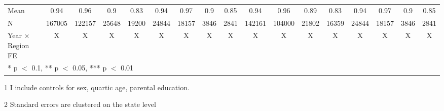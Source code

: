 \begin{landscape}
\begin{table}[H]
{\begin{threeparttable}
\begin{tabular}[t]{lcccccccccccccccc}
\midrule
Mean & \num{0.94} & \num{0.96} & \num{0.9} & \num{0.83} & \num{0.94} & \num{0.97} & \num{0.9} & \num{0.85} & \num{0.94} & \num{0.96} & \num{0.89} & \num{0.83} & \num{0.94} & \num{0.97} & \num{0.9} & \num{0.85}\\
N & \num{167005} & \num{122157} & \num{25648} & \num{19200} & \num{24844} & \num{18157} & \num{3846} & \num{2841} & \num{142161} & \num{104000} & \num{21802} & \num{16359} & \num{24844} & \num{18157} & \num{3846} & \num{2841}\\
Year $\times$ Region FE & X & X & X & X & X & X & X & X & X & X & X & X & X & X & X & X\\
\bottomrule
\multicolumn{17}{l}{\rule{0pt}{1em}* p $<$ 0.1, ** p $<$ 0.05, *** p $<$ 0.01}\\
\end{tabular}
\begin{tablenotes}
\small
\item[1] I include controls for sex, quartic age, parental education.
\item[2] Standard errors are clustered on the state level
\end{tablenotes}
\end{threeparttable}}
\end{table}
\end{landscape}
